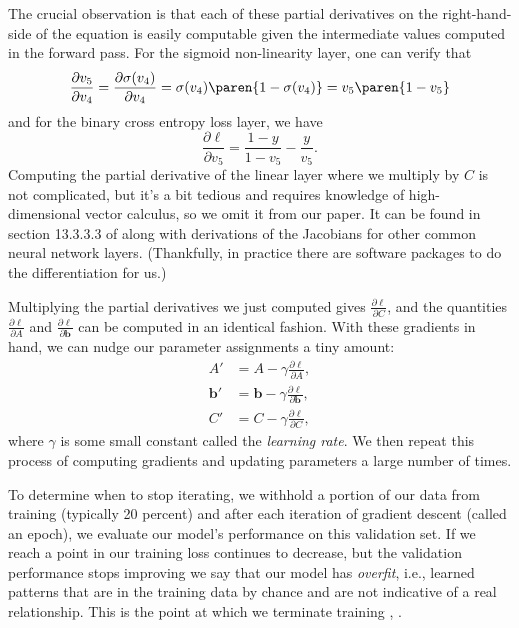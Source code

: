 The crucial observation is that each of these partial derivatives on the right-hand-side of the equation is easily computable given the intermediate values computed in the forward pass.
For the sigmoid non-linearity layer, one can verify that
\begin{equation}
	\frac{\partial v_5}{\partial v_4}
	= \frac{\partial \sigma(v_4)}{\partial v_4}
	= \sigma(v_4) \paren{1 - \sigma(v_4)}
	= v_5 \paren{1 - v_5}
\end{equation}
and for the binary cross entropy loss layer, we have
\begin{equation}
	\frac{\partial \ell}{\partial v_5} = \frac{1 - y}{1 - v_5} - \frac{y}{v_5}.
\end{equation}
Computing the partial derivative of the linear layer where we multiply by $C$ is not complicated, but it's a bit tedious and requires knowledge of high-dimensional vector calculus, so we omit it from our paper. It can be found in section 13.3.3.3 of \textcite{PML} along with derivations of the Jacobians for other common neural network layers. (Thankfully, in practice there are software packages to do the differentiation for us.)

Multiplying the partial derivatives we just computed gives $\frac{\partial \ell}{\partial C}$, and the quantities $\frac{\partial \ell}{\partial A}$ and $\frac{\partial \ell}{\partial \mathbf b}$ can be computed in an identical fashion. With these gradients in hand, we can nudge our parameter assignments a tiny amount:
\begin{equation}
	\begin{aligned}
		A'         & = A - \gamma \frac{\partial \ell}{\partial A},                 \\
		\mathbf b' & = \mathbf b - \gamma \frac{\partial \ell}{\partial \mathbf b}, \\
		C'         & = C - \gamma \frac{\partial \ell}{\partial C},
	\end{aligned}
\end{equation}
where $\gamma$ is some small constant called the \emph{learning rate}. We then repeat this process of computing gradients and updating parameters a large number of times.

To determine when to stop iterating, we withhold a portion of our data from training (typically 20 percent) and after each iteration of gradient descent (called an epoch), we evaluate our model's performance on this validation set.
If we reach a point in our training loss continues to decrease, but the validation performance stops improving we say that our model has \emph{overfit}, i.e., learned patterns that are in the training data by chance and are not indicative of a real relationship.
This is the point at which we terminate training \cite[\S 10.7.2]{ISL}, \cite[\S 13.5.1]{PML}.

